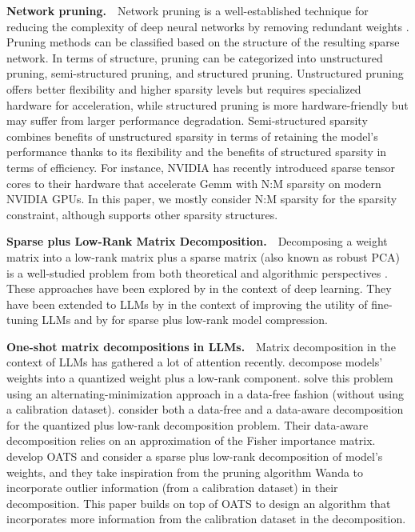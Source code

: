 
\textbf{Network pruning.\,\,\,\,} Network pruning is a well-established technique for reducing the complexity of deep neural networks by removing redundant weights \cite{obd,han2015learning}. Pruning methods can be classified based on the structure of the resulting sparse network. In terms of structure, pruning can be categorized into unstructured pruning, semi-structured pruning, and structured pruning. Unstructured pruning offers better flexibility and higher sparsity levels but requires specialized hardware for acceleration, while structured pruning is more hardware-friendly but may suffer from larger performance degradation. 
Semi-structured sparsity combines benefits of unstructured sparsity in terms of retaining the model's performance thanks to its flexibility and the benefits of structured sparsity in terms of efficiency. For instance, NVIDIA has recently introduced sparse tensor cores \cite{mozaffari2024slope} to their hardware that accelerate Gemm with N:M sparsity on modern NVIDIA GPUs. In this paper, we mostly consider N:M sparsity \cite{zhou2021learning} for the sparsity constraint, although \ourframework supports other sparsity structures.

\textbf{Sparse plus Low-Rank Matrix Decomposition.\,\,\,\,} Decomposing a weight matrix into a low-rank matrix plus a sparse matrix (also known as robust PCA) is a well-studied problem from both theoretical and algorithmic perspectives \cite{hintermuller2015robust, candes2011robust, lin2011linearized, 5394889, zhou2011godec}. These approaches have been explored by \citet{JMLR:v24:21-1130, NIPS2014_443cb001, yu2017compressing} in the context of deep learning. They have been extended to LLMs by \citet{li2023losparse} in the context of improving the utility of fine-tuning LLMs and by \citet{zhang2024oats} for sparse plus low-rank model compression.

\textbf{One-shot matrix decompositions in LLMs.\,\,\,\,} Matrix decomposition in the context of LLMs has gathered a lot of attention recently. \citet{li2023loftq, guo2023lq} decompose models' weights into a quantized weight plus a low-rank component. \citet{li2023loftq} solve this problem using an alternating-minimization approach in a data-free fashion (without using a calibration dataset). \citet{guo2023lq} consider both a data-free and a data-aware decomposition for the quantized plus low-rank decomposition problem. Their data-aware decomposition relies on an approximation of the Fisher importance matrix. \citet{zhang2024oats} develop OATS and consider a sparse plus low-rank decomposition of model's weights, and they take inspiration from the pruning algorithm Wanda \cite{sun2023simple} to incorporate outlier information (from a calibration dataset) in their decomposition. 
This paper builds on top of OATS \cite{zhang2024oats} to design an algorithm that incorporates more information from the calibration dataset in the decomposition.